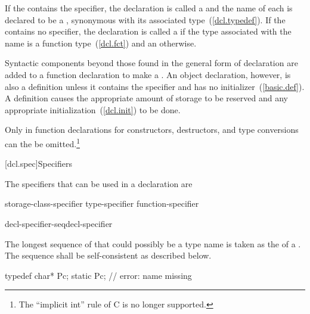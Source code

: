 \pnum
If the  contains the 
specifier, the declaration is called a  and the name
of each 
is declared to be a , synonymous with its
associated type~(\ref{dcl.typedef}). If the
 contains no  specifier, the
declaration is called a  if
the type associated with the name is a function type~(\ref{dcl.fct}) and
an  otherwise.

\pnum
{}%
Syntactic components beyond those found in the general form of
declaration are added to a function declaration to make a
. An object declaration, however, is also
a definition unless it contains the  specifier and has no
initializer~(\ref{basic.def}).
%
A
definition causes the appropriate amount of storage to be reserved and
any appropriate initialization~(\ref{dcl.init}) to be done.

\pnum
Only in function declarations for constructors, destructors, and type
conversions can the  be omitted.\footnote{The
``implicit int'' rule of C is no longer supported.}

[dcl.spec]{Specifiers}%

\pnum
{}%
The specifiers that can be used in a declaration are

\begin{bnf}
\br
    storage-class-specifier\br
    type-specifier\br
    function-specifier\br
    \br
\end{bnf}

\begin{bnf}
\br
    decl-specifier-seq\opt decl-specifier
\end{bnf}

\pnum
{}%
The longest sequence of  that could possibly
be a type name is taken as the  of a
. The sequence shall be self-consistent as
described below.
\enterexample

\begin{codeblock}
typedef char* Pc;
static Pc;                      // error: name missing
\end{codeblock}

